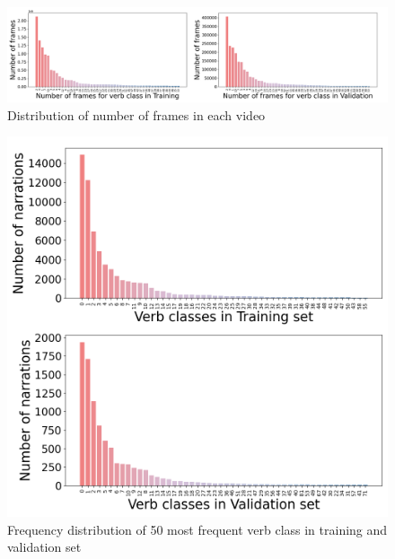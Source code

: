 \begin{figure}[htp!]
\begin{minipage}[b]{1\textwidth}
    \centering
    \includegraphics[scale=0.31]{figures/total_frame_word.png}
    \caption{Distribution of number of frames in each video}
    \label{fig:total-frame}
\end{minipage}
\end{figure}

\clearpage

\begin{figure}[t]
    \centering
    \includegraphics[scale=0.25]{figures/verb_count.png}
    \caption{Frequency distribution of 50 most frequent verb class in training and validation set}
    \label{fig:verb_freq}
\end{figure}


